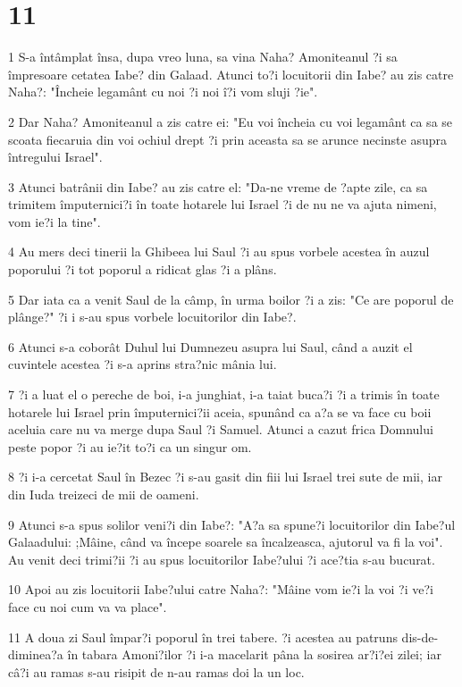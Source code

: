 \chapter{11}

\par 1 S-a întâmplat însa, dupa vreo luna, sa vina Naha? Amoniteanul ?i sa împresoare cetatea Iabe? din Galaad. Atunci to?i locuitorii din Iabe? au zis catre Naha?: "Încheie legamânt cu noi ?i noi î?i vom sluji ?ie".
\par 2 Dar Naha? Amoniteanul a zis catre ei: "Eu voi încheia cu voi legamânt ca sa se scoata fiecaruia din voi ochiul drept ?i prin aceasta sa se arunce necinste asupra întregului Israel".
\par 3 Atunci batrânii din Iabe? au zis catre el: "Da-ne vreme de ?apte zile, ca sa trimitem împuternici?i în toate hotarele lui Israel ?i de nu ne va ajuta nimeni, vom ie?i la tine".
\par 4 Au mers deci tinerii la Ghibeea lui Saul ?i au spus vorbele acestea în auzul poporului ?i tot poporul a ridicat glas ?i a plâns.
\par 5 Dar iata ca a venit Saul de la câmp, în urma boilor ?i a zis: "Ce are poporul de plânge?" ?i i s-au spus vorbele locuitorilor din Iabe?.
\par 6 Atunci s-a coborât Duhul lui Dumnezeu asupra lui Saul, când a auzit el cuvintele acestea ?i s-a aprins stra?nic mânia lui.
\par 7 ?i a luat el o pereche de boi, i-a junghiat, i-a taiat buca?i ?i a trimis în toate hotarele lui Israel prin împuternici?ii aceia, spunând ca a?a se va face cu boii aceluia care nu va merge dupa Saul ?i Samuel. Atunci a cazut frica Domnului peste popor ?i au ie?it to?i ca un singur om.
\par 8 ?i i-a cercetat Saul în Bezec ?i s-au gasit din fiii lui Israel trei sute de mii, iar din Iuda treizeci de mii de oameni.
\par 9 Atunci s-a spus solilor veni?i din Iabe?: "A?a sa spune?i locuitorilor din Iabe?ul Galaadului: ;Mâine, când va începe soarele sa încalzeasca, ajutorul va fi la voi". Au venit deci trimi?ii ?i au spus locuitorilor Iabe?ului ?i ace?tia s-au bucurat.
\par 10 Apoi au zis locuitorii Iabe?ului catre Naha?: "Mâine vom ie?i la voi ?i ve?i face cu noi cum va va place".
\par 11 A doua zi Saul împar?i poporul în trei tabere. ?i acestea au patruns dis-de-diminea?a în tabara Amoni?ilor ?i i-a macelarit pâna la sosirea ar?i?ei zilei; iar câ?i au ramas s-au risipit de n-au ramas doi la un loc.
